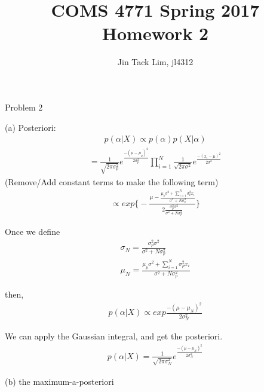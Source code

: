 \documentclass[11pt]{article}
\title{COMS 4771 Spring 2017 Homework 2}
\author{Jin Tack Lim, jl4312
  }
\date{%
  }
\theoremstyle{definition}
\begin{document}
\maketitle



\newcommand{\gau}[3]{
$\frac{1}{{ \sqrt {2\pi #3 ^2} }}e^{ \frac { - \left( {#1 - #2 } \right)^2 } {2#3 ^2}}$
}

\newcommand{\gauraw}[3]{
\frac{1}{{ \sqrt {2\pi #3 ^2} }}e^{ \frac { - \left( {#1 - #2 } \right)^2 } {2#3 ^2}}
}


Problem 2

(a) Posteriori:
\begin{eqnarray}
 p(\alpha | X ) \propto p(\alpha)p(X|\alpha) \nonumber 
\end{eqnarray}
\begin{eqnarray}
 = \gauraw{\mu}{\mu_p}{\sigma_p} \prod_{i=1}^{N} \gauraw{x_i}{\mu}{\sigma} \nonumber
\end{eqnarray}
(Remove/Add constant terms to make the following term)
\begin{eqnarray}
 \propto exp\Bigg\{ - \frac {\mu - \frac{\mu_p\sigma^2 + \sum_{i=1}^{N} \sigma_p^2x_i}{\sigma^2 + N\sigma_p^2}}
		{2 \frac{\sigma_p^2\sigma^2}{\sigma^2 + N\sigma_p^2}} \Bigg\} \nonumber
\end{eqnarray}

Once we define
\begin{eqnarray}
\sigma_N = \frac{\sigma_p^2\sigma^2}{\sigma^2 + N\sigma_p^2} \nonumber \\
\mu_N = \frac{\mu_p\sigma^2 + \sum_{i=1}^{N} \sigma_p^2x_i}{\sigma^2 + N\sigma_p^2} \nonumber
\end{eqnarray}

then,
\begin{eqnarray}
 p(\alpha | X ) \propto exp{\frac{-(\mu - \mu_N)^2}{2\sigma_N^2}} \nonumber 
\end{eqnarray}

We can apply the Gaussian integral, and get the posteriori.
\begin{eqnarray}
 p(\alpha | X ) = \gauraw{\mu}{\mu_N}{\sigma_N} \nonumber
\end{eqnarray}

(b) the maximum-a-posteriori
\end{document}
